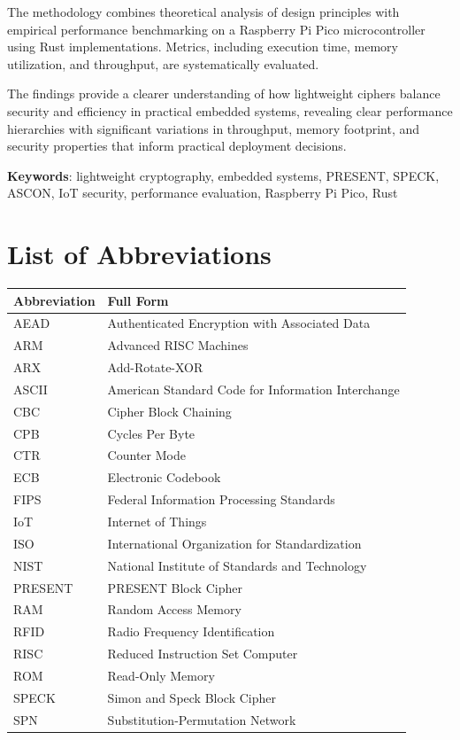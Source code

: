 \documentclass[12pt]{report}
\begin{document}
The methodology combines theoretical analysis of design principles with empirical
performance benchmarking on a Raspberry Pi Pico microcontroller using Rust
implementations. Metrics, including execution time, memory utilization, and throughput,
are systematically evaluated.

The findings provide a clearer understanding of how lightweight ciphers balance
security and efficiency in practical embedded systems, revealing clear performance
hierarchies with significant variations in throughput, memory footprint, and
security properties that inform practical deployment decisions.

\vspace{1cm}
\noindent \textbf{Keywords}: lightweight cryptography, embedded systems, PRESENT, SPECK,
ASCON, IoT security, performance evaluation, Raspberry Pi Pico, Rust

\newpage
\tableofcontents

\begingroup
\let\clearpage\relax
\listoftables
\listoffigures
\chapter*{List of Abbreviations}
\endgroup

\begin{tabular}{lp{12cm}}
\toprule
\textbf{Abbreviation} & \textbf{Full Form} \\
\midrule
AEAD & Authenticated Encryption with Associated Data \\
ARM & Advanced RISC Machines \\
ARX & Add-Rotate-XOR \\
ASCII & American Standard Code for Information Interchange \\
CBC & Cipher Block Chaining \\
CPB & Cycles Per Byte \\
CTR & Counter Mode \\
ECB & Electronic Codebook \\
FIPS & Federal Information Processing Standards \\
IoT & Internet of Things \\
ISO & International Organization for Standardization \\
NIST & National Institute of Standards and Technology \\
PRESENT & PRESENT Block Cipher \\
RAM & Random Access Memory \\
RFID & Radio Frequency Identification \\
RISC & Reduced Instruction Set Computer \\
ROM & Read-Only Memory \\
SPECK & Simon and Speck Block Cipher \\
SPN & Substitution-Permutation Network \\
\bottomrule
\end{tabular}
\end{document}
